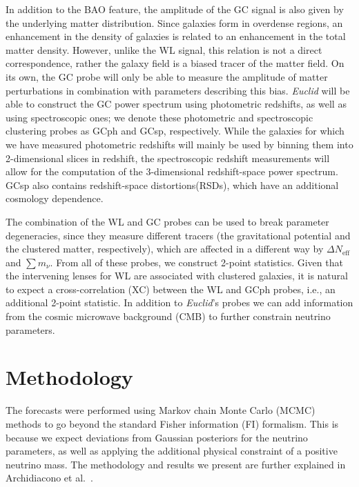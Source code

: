 \documentclass[a4paper,11pt]{article}
\newcommand{\euclid}{\textit{Euclid}\xspace}
\newcommand{\dneff}{\Delta N_\mathrm{eff}}
\newcommand{\summnu}{\sum m_\nu}
\begin{document}
In addition to the BAO feature, the amplitude of the GC signal is also given by the underlying matter distribution. Since galaxies form in overdense regions, an enhancement in the density of galaxies is related to an enhancement in the total matter density. However, unlike the WL signal, this relation is not a direct correspondence, rather the galaxy field is a biased tracer of the matter field. On its own, the GC probe will only be able to measure the amplitude of matter perturbations in combination with parameters describing this bias.  \euclid will be able to construct the GC power spectrum using photometric redshifts, as well as using spectroscopic ones; we denote these photometric and spectroscopic clustering probes as GCph and GCsp, respectively. While the galaxies for which we have measured photometric redshifts will mainly be used by binning them into 2-dimensional slices in redshift, the spectroscopic redshift measurements will allow for the computation of the 3-dimensional redshift-space power spectrum. GCsp also contains redshift-space distortions(RSDs), which have an additional cosmology dependence.

The combination of the WL and GC probes can be used to break parameter degeneracies, since they measure different tracers (the gravitational potential and the clustered matter, respectively), which are affected in a different way by $\dneff$ and $\summnu$. From all of these probes, we construct 2-point statistics. Given that the intervening lenses for WL are associated with clustered galaxies, it is natural to expect a cross-correlation (XC) between the WL and GCph probes, i.e., an additional 2-point statistic.  In addition to \euclid's probes
we can add information from the cosmic microwave background (CMB) to further constrain neutrino parameters.

\section{Methodology}

The forecasts were performed using Markov chain Monte Carlo (MCMC) methods to go beyond the standard Fisher information (FI) formalism. This is because we expect deviations from Gaussian posteriors for the neutrino parameters, as well as applying the additional physical constraint of a positive neutrino mass. The methodology and results we present are further explained in Archidiacono et al.~\cite{EP-Archidiacono}.
\end{document}
